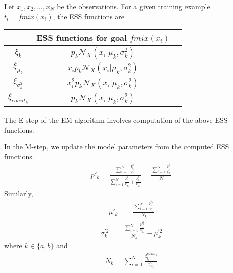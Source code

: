 \begin{Ex}
Let $x_{1}, x_{2}, ..., x_{N}$ be the observations. For a given training example $t_{i} = fmix(x_{i})$, the ESS functions are 
 \begin{center}
\begin{tabular}{|c|c|c|}
  \hline
  &  ESS functions for goal $fmix(x_{i})$ \\ \hline
  $\xi_{k}$ & $ p_{k} \mathcal{N}_{X}(x_{i}|\mu_{k}, \sigma^{2}_{k})$  \\ \hline
  $\xi_{\mu_{k}}$ & $x_{i} p_{k}  \mathcal{N}_{X}(x_{i}|\mu_{k}, \sigma^{2}_{k})$  \\ \hline
  $\xi_{\sigma^{2}_{k}}$ & $x_{i}^{2} p_{k}  \mathcal{N}_{X}(x_{i}|\mu_{k}, \sigma^{2}_{k})$  \\ \hline
  $\xi_{count_{k}}$ & $p_{k}  \mathcal{N}_{X}(x_{i}|\mu_{k}, \sigma^{2}_{k})$  \\ \hline
\end{tabular}
\end{center}
The E-step of the EM algorithm involves computation of the above ESS functions.

In the M-step, we update the model parameters from the computed ESS functions.
\begin{align}
\label{pa}
p'_{k} = \frac{\sum_{i=1}^{N} \frac{\xi^{k}_{t_i}} {\psi_{t_i}}} {\sum_{i=1}^{N} \frac{\xi^{a}_{t_i}} {\psi_{t_i}} + \frac{\xi^{b}_{t_i}} {\psi_{t_i}}} = \frac{\sum_{i=1}^{N} \frac{\xi^{k}_{t_i}} {\psi_{t_i}}} {N}
\end{align}
Similarly, 
\begin{align}
\label{mua}
\mu'_{k} &= \frac {\sum_{i=1}^{N} \frac{\xi^{\mu_{k}}_{t_i}} {\psi_{t_i}}} {N_{k}}
\end{align}
\begin{align}
\sigma_{k}^{'2}  &= \frac {\sum_{i=1}^{N} \frac{\xi^{\sigma_{k}^{2}}_{t_i}} {\psi_{t_i}}} {N_{k}} - \mu_{k}^{'2}
\end{align}
where $k \in \{a,b\}$ and
\begin{align}
N_{k} = \sum_{i=1}^{N} \frac{\xi^{count_k}_{t_i}} {\psi_{t_i}}
\end{align}
\end{Ex}


